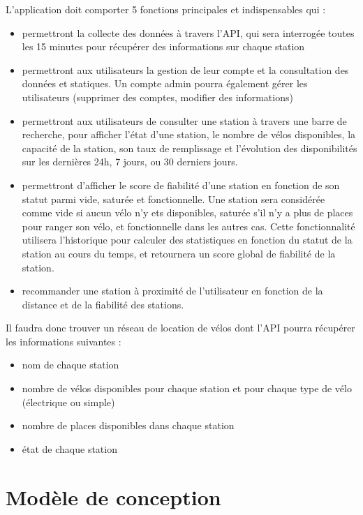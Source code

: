 \documentclass[
  french,
  11pt,
  a4paper,
]{article}
\providecommand{\tightlist}{%
  \setlength{\itemsep}{0pt}\setlength{\parskip}{0pt}}
\begin{document}
L'application doit comporter 5 fonctions principales et indispensables
qui :

\begin{itemize}
\item
  permettront la collecte des données à travers l'API, qui sera
  interrogée toutes les 15 minutes pour récupérer des informations sur
  chaque station ~~~~
\item
  permettront aux utilisateurs la gestion de leur compte et la
  consultation des données et statiques. Un compte admin pourra
  également gérer les utilisateurs (supprimer des comptes, modifier des
  informations)
\item
  permettront aux utilisateurs de consulter une station à travers une
  barre de recherche, pour afficher l'état d'une station, le nombre de
  vélos disponibles, la capacité de la station, son taux de remplissage
  et l'évolution des disponibilités sur les dernières 24h, 7 jours, ou
  30 derniers jours.
\item
  permettront d'afficher le score de fiabilité d'une station en fonction
  de son statut parmi vide, saturée et fonctionnelle. Une station sera
  considérée comme vide si aucun vélo n'y ets disponibles, saturée s'il
  n'y a plus de places pour ranger son vélo, et fonctionnelle dans les
  autres cas. Cette fonctionnalité utilisera l'historique pour calculer
  des statistiques en fonction du statut de la station au cours du
  temps, et retournera un score global de fiabilité de la station.
\item
  recommander une station à proximité de l'utilisateur en fonction de la
  distance et de la fiabilité des stations.
\end{itemize}

Il faudra donc trouver un réseau de location de vélos dont l'API pourra
récupérer les informations suivantes :

\begin{itemize}
\tightlist
\item
  nom de chaque station
\item
  nombre de vélos disponibles pour chaque station et pour chaque type de
  vélo (électrique ou simple)
\item
  nombre de places disponibles dans chaque station
\item
  état de chaque station
\end{itemize}

\section{Modèle de conception}\label{moduxe8le-de-conception}
\end{document}
